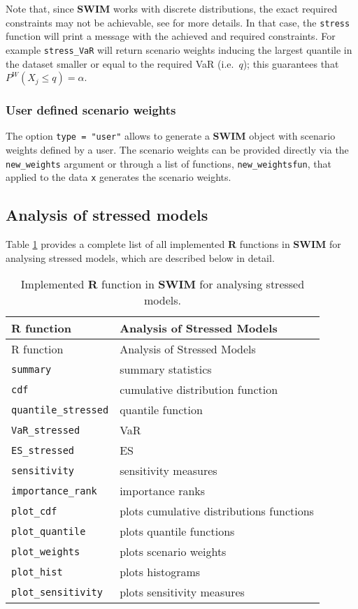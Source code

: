 \documentclass[
]{article}
\begin{document}
Note that, since \textbf{SWIM} works with discrete distributions, the exact required constraints may not be achievable, see \citet{Pesenti2019} for more details. In that case, the \texttt{stress} function will print a message with the achieved and required constraints. For example \texttt{stress\_VaR} will return scenario weights inducing the largest quantile in the dataset smaller or equal to the required VaR (i.e.~\(q\)); this guarantees that \(P^W(X_j\leq q)=\alpha\).

\hypertarget{Sec:User}{%
\subsubsection{User defined scenario weights}\label{Sec:User}}

The option \texttt{type\ =\ "user"} allows to generate a \textbf{SWIM} object with scenario weights defined by a user. The scenario weights can be provided directly via the \texttt{new\_weights} argument or through a list of functions, \texttt{new\_weightsfun}, that applied to the data \texttt{x} generates the scenario weights.

\hypertarget{Sec:analysis}{%
\subsection{Analysis of stressed models}\label{Sec:analysis}}

Table \ref{tab:Ranalysis} provides a complete list of all implemented \textbf{R} functions in \textbf{SWIM} for analysing stressed models, which are described below in detail.

\begin{longtable}[]{@{}ll@{}}
\caption{\label{tab:Ranalysis} Implemented \textbf{R} function in \textbf{SWIM} for analysing stressed models.}\tabularnewline
\toprule
R function & Analysis of Stressed Models\tabularnewline
\midrule
\endfirsthead
\toprule
R function & Analysis of Stressed Models\tabularnewline
\midrule
\endhead
\texttt{summary} & summary statistics\tabularnewline
\texttt{cdf} & cumulative distribution function\tabularnewline
\texttt{quantile\_stressed} & quantile function\tabularnewline
\texttt{VaR\_stressed} & VaR\tabularnewline
\texttt{ES\_stressed} & ES\tabularnewline
\texttt{sensitivity} & sensitivity measures\tabularnewline
\texttt{importance\_rank} & importance ranks\tabularnewline
\texttt{plot\_cdf} & plots cumulative distributions functions\tabularnewline
\texttt{plot\_quantile} & plots quantile functions\tabularnewline
\texttt{plot\_weights} & plots scenario weights\tabularnewline
\texttt{plot\_hist} & plots histograms\tabularnewline
\texttt{plot\_sensitivity} & plots sensitivity measures\tabularnewline
\bottomrule
\end{longtable}
\end{document}
